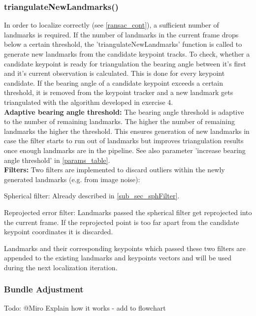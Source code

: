 \subsubsection{triangulateNewLandmarks()} \label{triang_cont}
In order to localize correctly (see \cref{ransac_cont}), a sufficient number of landmarks is required. If the number of landmarks in the current frame drops below a certain threshold, the 'triangulateNewLandmarks' function is called to generate new landmarks from the candidate keypoint tracks. To check, whether a candidate keypoint is ready for triangulation the bearing angle between it's first and it's current observation is calculated. This is done for every keypoint candidate. If the bearing angle of a candidate keypoint exceeds a certain threshold, it is removed from the keypoint tracker and a new landmark gets triangulated with the algorithm developed in exercise 4.\\
\textbf{Adaptive bearing angle threshold: }The bearing angle threshold is adaptive to the number of remaining landmarks. The higher the number of remaining landmarks the higher the threshold. This ensures generation of new landmarks in case the filter starts to run out of landmarks but improves triangulation results once enough landmarks are in the pipeline. See also parameter 'increase bearing angle threshold' in \cref{params_table}.\\
\textbf{Filters:} Two filters are implemented to discard outliers within the newly generated landmarks (e.g. from image noise):
\begin{compactenum}
	\item Spherical filter: Already described in \cref{sub_sec_sphFilter}.
	\item Reprojected error filter: Landmarks passed the spherical filter get reprojected into the current frame. If the reprojected point is too far apart from the candidate keypoint coordinates it is discarded.
\end{compactenum}
Landmarks and their corresponding keypoints which passed these two filters are appended to the existing landmarks and keypoints vectors and will be used during the next localization iteration.

\subsubsection{Bundle Adjustment}
Todo: @Miro
Explain how it works - add to flowchart


